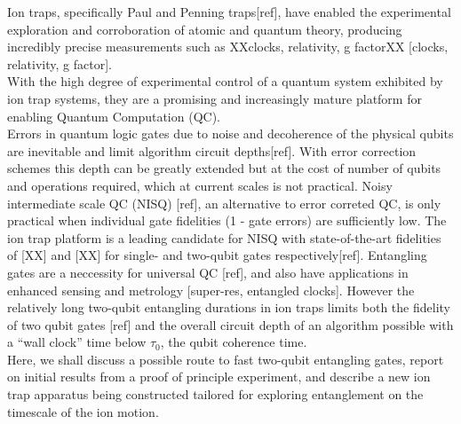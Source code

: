 \documentclass[12pt]{iopart}
\begin{document}
Ion traps, specifically Paul and Penning traps[ref], have enabled the
experimental exploration and corroboration of atomic and quantum
theory, producing incredibly precise measurements such as XXclocks,
relativity, g factorXX [clocks, relativity, g factor].\\ With the high
degree of experimental control of a quantum system exhibited by ion
trap systems, they are a promising and increasingly mature platform
for enabling Quantum Computation (QC).\\ Errors in quantum logic gates
due to noise and decoherence of the physical qubits are inevitable and
limit algorithm circuit depths[ref]. With error correction schemes
this depth can be greatly extended but at the cost of number of qubits
and operations required, which at current scales is not practical.
Noisy intermediate scale QC (NISQ) [ref], an alternative to error
correted QC, is only practical when individual gate fidelities (1 -
gate errors) are sufficiently low.  The ion trap platform is a leading
candidate for NISQ with state-of-the-art fidelities of [XX] and [XX]
for single- and two-qubit gates respectively[ref].  Entangling gates
are a neccessity for universal QC [ref], and also have applications in
enhanced sensing and metrology [super-res, entangled clocks].  However
the relatively long two-qubit entangling durations in ion traps limits
both the fidelity of two qubit gates [ref] and the overall circuit
depth of an algorithm possible with a ``wall clock'' time below
$\tau_0$, the qubit coherence time.\\
Here, we shall discuss a possible route to fast two-qubit entangling
gates, report on initial results from a proof of principle experiment,
and describe a new ion trap apparatus being constructed tailored for
exploring entanglement on the timescale of the ion motion.\\
\end{document}
